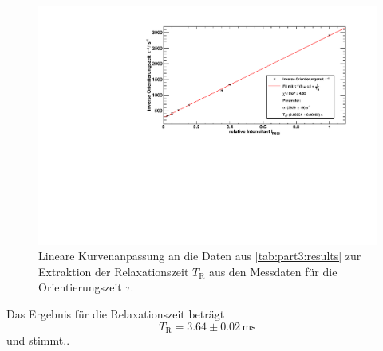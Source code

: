 \begin{figure}[H]
\begin{center}
  \includegraphics[width=\textwidth]{../img/part5/taufit.pdf}
  \caption{Lineare Kurvenanpassung an die Daten aus \autoref{tab:part3:results} zur Extraktion
  der Relaxationszeit $T_\text{R}$ aus den Messdaten für die Orientierungszeit $\tau$.}
  \label{img:deh:relaxtime}
\end{center}
\end{figure}

Das Ergebnis für die Relaxationszeit beträgt
\begin{equation}
  T_\text{R} = 3.64 \pm 0.02\,\text{ms}
\end{equation}
und stimmt..



